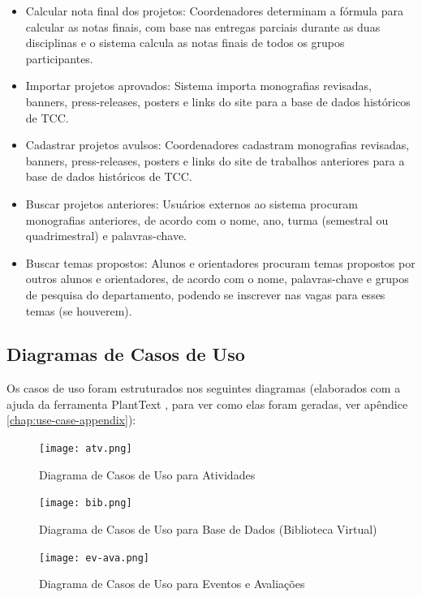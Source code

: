 \begin{itemize}
    \item Calcular nota final dos projetos: Coordenadores determinam a fórmula para calcular as notas finais, com base nas entregas parciais durante as duas disciplinas e o sistema calcula as notas finais de todos os grupos participantes.
    \item Importar projetos aprovados: Sistema importa monografias revisadas, banners, press-releases, posters e links do site para a base de dados históricos de TCC.
    \item Cadastrar projetos avulsos: Coordenadores cadastram monografias revisadas, banners, press-releases, posters e links do site de trabalhos anteriores para a base de dados históricos de TCC.
    \item Buscar projetos anteriores: Usuários externos ao sistema procuram monografias anteriores, de acordo com o nome, ano, turma (semestral ou quadrimestral) e palavras-chave.
    \item Buscar temas propostos: Alunos e orientadores procuram temas propostos por outros alunos e orientadores, de acordo com o nome, palavras-chave e grupos de pesquisa do departamento, podendo se inscrever nas vagas para esses temas (se houverem).
\end{itemize}

\subsection{Diagramas de Casos de Uso}
Os casos de uso foram estruturados nos seguintes diagramas (elaborados com a ajuda da ferramenta PlantText \cite{planttext2018}, para ver como elas foram geradas, ver apêndice \ref{chap:use-case-appendix}):

\begin{figure}[H]
    \centering
    \texttt{[image: atv.png]}
    \caption{Diagrama de Casos de Uso para Atividades}
    \label{fig:use-case-atv}
\end{figure}

\begin{figure}[H]
    \centering
    \texttt{[image: bib.png]}
    \caption{Diagrama de Casos de Uso para Base de Dados (Biblioteca Virtual)}
    \label{fig:use-case-atv}
\end{figure}

\begin{figure}[H]
    \centering
    \texttt{[image: ev-ava.png]}
    \caption{Diagrama de Casos de Uso para Eventos e Avaliações}
    \label{fig:use-case-atv}
\end{figure}

